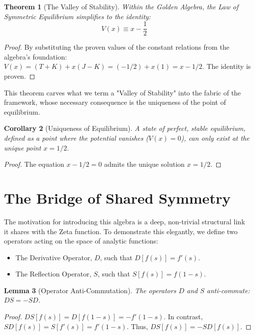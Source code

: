 \documentclass{article}
\theoremstyle{plain}
\newtheorem{theorem}{Theorem}[section]
\newtheorem{lemma}[theorem]{Lemma}
\newtheorem{corollary}[theorem]{Corollary}
\theoremstyle{definition}
\theoremstyle{remark}
\begin{document}
\begin{theorem}[The Valley of Stability]
Within the Golden Algebra, the Law of Symmetric Equilibrium simplifies to the identity:
$$ V(x) \equiv x - \frac{1}{2} \quad \text{}$$
\end{theorem}
\begin{proof}
By substituting the proven values of the constant relations from the algebra's foundation:
$V(x) = (T+K) + x(J-K) = (-1/2) + x(1) = x - 1/2$. The identity is proven.
\end{proof}

This theorem carves what we term a "Valley of Stability" into the fabric of the framework, whose necessary consequence is the uniqueness of the point of equilibrium.

\begin{corollary}[Uniqueness of Equilibrium]
A state of perfect, stable equilibrium, defined as a point where the potential vanishes ($V(x)=0$), can only exist at the unique point $x=1/2$.
\end{corollary}
\begin{proof}
The equation $x - 1/2 = 0$ admits the unique solution $x=1/2$.
\end{proof}

\section{The Bridge of Shared Symmetry}
\label{sec:bridge}

The motivation for introducing this algebra is a deep, non-trivial structural link it shares with the Zeta function. To demonstrate this elegantly, we define two operators acting on the space of analytic functions:

\begin{itemize}
    \item The Derivative Operator, $D$, such that $D[f(s)] = f'(s)$.
    \item The Reflection Operator, $S$, such that $S[f(s)] = f(1-s)$.
\end{itemize}

\begin{lemma}[Operator Anti-Commutation]
The operators $D$ and $S$ anti-commute: $DS = -SD$.
\end{lemma}
\begin{proof}
$DS[f(s)] = D[f(1-s)] = -f'(1-s)$. In contrast, $SD[f(s)] = S[f'(s)] = f'(1-s)$. Thus, $DS[f(s)] = -SD[f(s)]$.
\end{proof}
\end{document}
